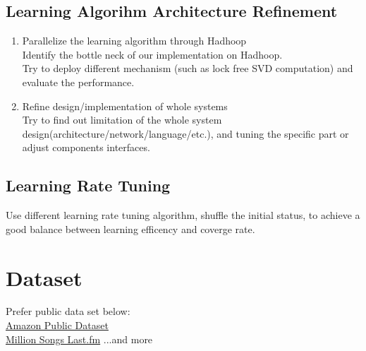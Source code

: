 \documentclass[11pt]{article}
\begin{document}
\subsection{Learning Algorihm Architecture Refinement}
\begin{enumerate}
\item Parallelize the learning algorithm through Hadhoop\\
Identify the bottle neck of our implementation on Hadhoop.\\
Try to deploy different mechanism (such as lock free SVD computation) and evaluate the performance.
\item Refine design/implementation of whole systems\\
Try to find out limitation of the whole system design(architecture/network/language/etc.),
and tuning the specific part or adjust components interfaces.
\end{enumerate}

\subsection{Learning Rate Tuning}
Use different learning rate tuning algorithm, shuffle the initial status,
to achieve a good balance between learning efficency and coverge rate.


\section{Dataset}
Prefer public data set below:\\
\href{http://aws.amazon.com/datasets/}{Amazon Public Dataset}\\
\href{http://labrosa.ee.columbia.edu/millionsong/lastfm}{Million Songs Last.fm}
...and more
\end{document}
